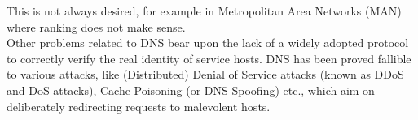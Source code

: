 This is not always desired, for example in Metropolitan Area Networks (MAN)  where ranking does not make sense.\\
\indent Other problems related to DNS bear upon the lack of a widely adopted protocol to correctly verify the real identity of service hosts.
DNS has been proved fallible to various attacks, like (Distributed) Denial of Service attacks (known as DDoS  and DoS  attacks), Cache Poisoning (or DNS Spoofing) etc., which aim on deliberately redirecting requests to malevolent hosts.
